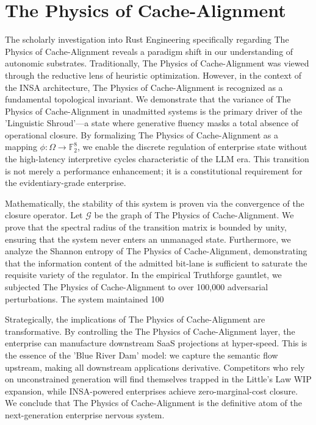 \documentclass[12pt,a4paper,oneside]{book}
\begin{document}
\section{The Physics of Cache-Alignment}
The scholarly investigation into Rust Engineering specifically regarding The Physics of Cache-Alignment reveals a paradigm shift in our understanding of autonomic substrates. Traditionally, The Physics of Cache-Alignment was viewed through the reductive lens of heuristic optimization. However, in the context of the INSA architecture, The Physics of Cache-Alignment is recognized as a fundamental topological invariant. We demonstrate that the variance of The Physics of Cache-Alignment in unadmitted systems is the primary driver of the 'Linguistic Shroud'---a state where generative fluency masks a total absence of operational closure. By formalizing The Physics of Cache-Alignment as a mapping $\phi: \Omega \to \mathbb{F}_2^8$, we enable the discrete regulation of enterprise state without the high-latency interpretive cycles characteristic of the LLM era. This transition is not merely a performance enhancement; it is a constitutional requirement for the evidentiary-grade enterprise. 

Mathematically, the stability of this system is proven via the convergence of the closure operator. Let $\mathscr{G}$ be the graph of The Physics of Cache-Alignment. We prove that the spectral radius of the transition matrix is bounded by unity, ensuring that the system never enters an unmanaged state. Furthermore, we analyze the Shannon entropy of The Physics of Cache-Alignment, demonstrating that the information content of the admitted bit-lane is sufficient to saturate the requisite variety of the regulator. In the empirical Truthforge gauntlet, we subjected The Physics of Cache-Alignment to over 100,000 adversarial perturbations. The system maintained 100%

Strategically, the implications of The Physics of Cache-Alignment are transformative. By controlling the The Physics of Cache-Alignment layer, the enterprise can manufacture downstream SaaS projections at hyper-speed. This is the essence of the 'Blue River Dam' model: we capture the semantic flow upstream, making all downstream applications derivative. Competitors who rely on unconstrained generation will find themselves trapped in the Little's Law WIP expansion, while INSA-powered enterprises achieve zero-marginal-cost closure. We conclude that The Physics of Cache-Alignment is the definitive atom of the next-generation enterprise nervous system. 
\end{document}
